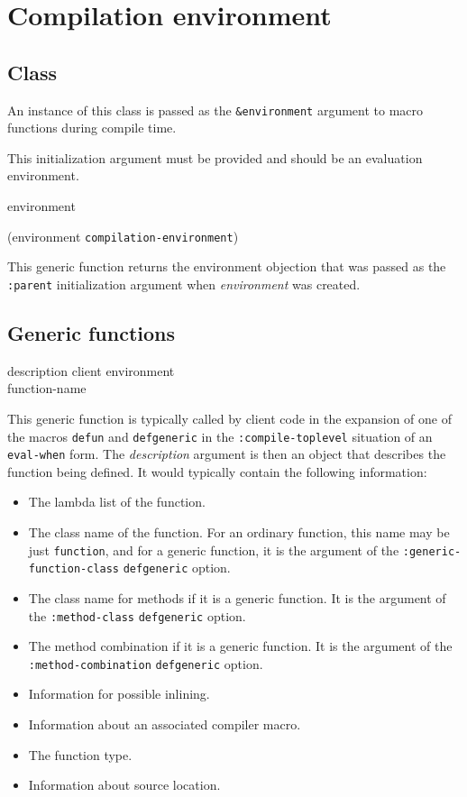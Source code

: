 \chapter{Compilation environment}

\section{Class}


An instance of this class is passed as the \texttt{\&environment}
argument to macro functions during compile time.


This initialization argument must be provided and should be
an evaluation environment.

 {environment}

 {(environment {\tt compilation-environment})}

This generic function returns the environment objection that was passed
as the \texttt{:parent} initialization argument when
\textit{environment} was created.

\section{Generic functions}

{\small{} {description client environment \\
function-name}
}

This generic function is typically called by client code in the
expansion of one of the macros \texttt{defun} and
\texttt{defgeneric} in the \texttt{:compile-toplevel} situation of an
\texttt{eval-when} form.  The \textit{description} argument is then an
object that describes the function being defined.  It would typically
contain the following information:

\begin{itemize}
\item The lambda list of the function.
\item The class name of the function.  For an ordinary function, this
  name may be just \texttt{function}, and for a generic function, it
  is the argument of the \texttt{:generic-function-class}
  \texttt{defgeneric} option.
\item The class name for methods if it is a generic function.  It is
  the argument of the \texttt{:method-class} \texttt{defgeneric}
  option.
\item The method combination if it is a generic function.  It is the
  argument of the \texttt{:method-combination} \texttt{defgeneric}
  option.
\item Information for possible inlining.
\item Information about an associated compiler macro.
\item The function type.
\item Information about source location.
\end{itemize}

